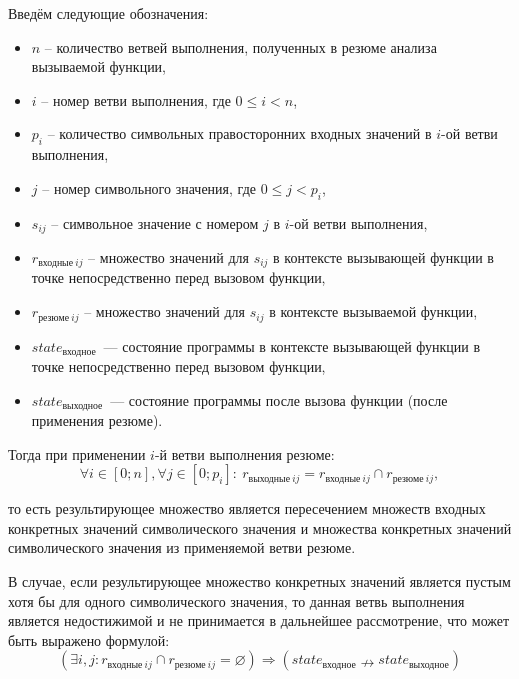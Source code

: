 Введём следующие обозначения:
\begin{itemize}
 \item $n$ – количество ветвей выполнения, полученных в резюме анализа вызываемой функции,
 \item $i$ – номер ветви выполнения, где $0 \leqslant i < n$,
 \item $p_i$ – количество символьных правосторонних входных значений в $i$-ой ветви выполнения,
 \item $j$ – номер символьного значения, где $0 \leqslant j < p_i$,
 \item $s_{ij}$ – символьное значение с номером $j$ в $i$-ой ветви выполнения,
 \item $r_{\text{входные}\ ij}$ – множество значений для $s_{ij}$ в контексте вызывающей функции в точке непосредственно перед вызовом функции,
 \item $r_{\text{резюме}\ ij}$ – множество значений для $s_{ij}$ в контексте вызываемой функции,
 \item $state_{\text{входное}}$~--- состояние программы в контексте вызывающей функции в точке непосредственно перед вызовом функции,
 \item $state_{\text{выходное}}$~--- состояние программы после вызова функции (после применения резюме).

\end{itemize}

Тогда при применении $i$-й ветви выполнения резюме:
\begin{equation*}
\label{result_sval}
 \forall i \in [0; n], \forall j \in [0; p_i]:\ r_{\text{выходные}\ ij} =  r_{\text{входные}\ ij} \cap r_{\text{резюме}\ ij},
\end{equation*}

то есть результирующее множество является пересечением множеств входных конкретных значений символического значения и множества конкретных значений символического значения из применяемой ветви резюме.

В случае, если результирующее множество конкретных значений является пустым хотя бы для одного символического значения, то данная ветвь выполнения является недостижимой и не принимается в дальнейшее рассмотрение, что может быть выражено формулой:
\begin{equation*}
 \label{empty_set}
 (\exists i, j: r_{\text{входные}\ ij} \cap r_{\text{резюме}\ ij} = \varnothing)  \Rightarrow (state_{\text{входное}} \nrightarrow state_{\text{выходное}})
\end{equation*}

